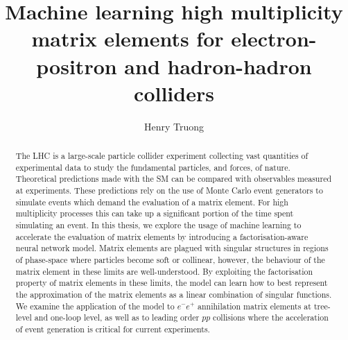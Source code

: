 \documentclass[twoside,openright,frontopenright]{ip3thesis}
\begin{document}
\title{Machine learning high multiplicity matrix elements for electron-positron and hadron-hadron colliders}
\author{Henry Truong}
\maketitlepage*

\begin{abstract}
%
	The LHC is a large-scale particle collider experiment
	collecting vast quantities of experimental data to study the fundamental
	particles, and forces, of nature. Theoretical predictions made with
	the SM can be compared with observables measured at experiments.
	These predictions rely on the use of Monte Carlo event generators to 
	simulate events which demand the evaluation of a matrix element.
	For high multiplicity processes this can take up a significant
	portion of the time spent simulating an event.
	In this thesis, we explore the usage of machine learning
	to accelerate the evaluation of matrix elements by introducing a
	factorisation-aware neural network model. Matrix elements are plagued with singular
	structures in regions of phase-space where particles become soft or collinear,
	however, the behaviour of the matrix element in these limits are well-understood.
	By exploiting the factorisation property of matrix elements in these limits,
	the model can learn how to best represent the approximation
	of the matrix elements as a linear combination of singular functions.
	We examine the application of the model to $e^{-}e^{+}$
	annihilation matrix elements at tree-level and one-loop level, as well
	as to leading order $pp$ collisions where the acceleration of event generation
	is critical for current experiments.
%
\end{abstract}

\disableprotrusion
\tableofcontents*
\listoffigures
\listoftables
\enableprotrusion
\end{document}
